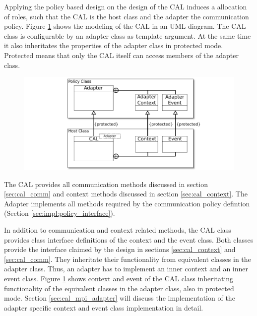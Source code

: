 Applying the policy based design on the design of the CAL
induces a allocation of roles, such that the CAL is the host class and
the adapter the communication policy. Figure \ref{fig:cal_uml} shows
the modeling of the CAL in an UML diagram. The CAL class is configurable by
an adapter class as template argument. At the same time it also inheritates
the properties of the adapter class in protected mode. Protected means
that only the CAL itself can access members of the adapter class.

\begin{figure}[H]
  \centering \includegraphics[width=\textwidth]{graphics/40_cal_uml}
  \caption{ }
  \label{fig:cal_uml}
\end{figure}

The CAL provides all communication methods discussed in section
\ref{sec:cal_comm} and context methods discussed in section
\ref{sec:cal_context}. The Adapter implements all methods
required by the communication policy defintion (Section \ref{sec:impl:policy_interface}).

In addition to communication and context related methods, the CAL
class provides class interface definitions of the context and the
event class. Both classes provide the interface claimed by the design
in sections \ref{sec:cal_context} and \ref{sec:cal_comm}. They
inheritate their functionality from equivalent classes in the adapter
class. Thus, an adapter has to implement an inner context and an inner
event class.  Figure \ref{fig:cal_uml} shows context and event of the
CAL class inheritating functionality of the equivalent classes in the
adapter class, also in protected mode. Section
\ref{sec:cal_mpi_adapter} will discuss the implementation of the
adapter specific context and event class implementation in detail.

